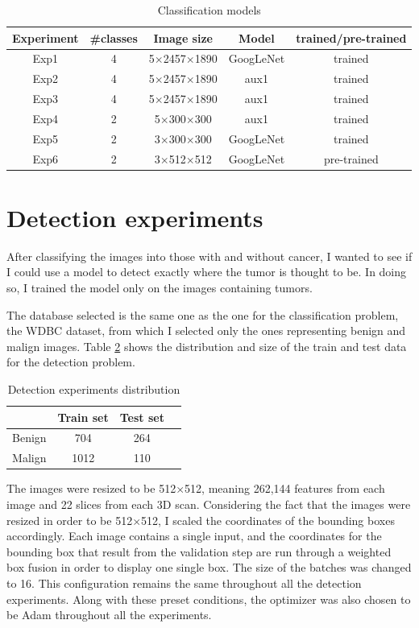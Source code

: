 \begin{table}[!ht]
    \centering
    \begin{tabular}{|c|c|c|c|c|}
    \hline
    Experiment & \#classes & Image size & Model & trained/pre-trained\\
    \hline\hline
    Exp1 & 4 & 5$\times$2457$\times$1890 & GoogLeNet & trained \\
    \hline
    Exp2 & 4 & 5$\times$2457$\times$1890 & aux1 & trained \\
    \hline
    Exp3 & 4 & 5$\times$2457$\times$1890 & aux1 & trained \\
    \hline
    Exp4 & 2 & 5$\times$300$\times$300 & aux1 & trained \\
    \hline
    Exp5 & 2 & 3$\times$300$\times$300 & GoogLeNet & trained \\
    \hline
    Exp6 & 2 & 3$\times$512$\times$512 & GoogLeNet & pre-trained \\
    \hline
    \end{tabular}
    \caption{Classification models}
    \label{tab:tab4}
\end{table}


\section{Detection experiments}

After classifying the images into those with and without cancer, I wanted to see if I could use a model to detect exactly where the tumor is thought to be. In doing so, I trained the model only on the images containing tumors.

The database selected is the same one as the one for the classification problem, the WDBC dataset, from which I selected only the ones representing benign and malign images. Table \ref{tab:tab7} shows the distribution and size of the train and test data for the detection problem.

\begin{table}[ht!]
\centering
\begin{tabular}{|c|c|c|c|}
    \hline
    & Train set & Test set \\ \hline
    Benign & 704 & 264 \\ \hline
    Malign & 1012 & 110\\ \hline
    \end{tabular}
    \caption{Detection experiments distribution}
    \label{tab:tab7}
\end{table}

The images were resized to be 512$\times$512, meaning 262,144 features from each image and 22 slices from each 3D scan. Considering the fact that the images were resized in order to be 512$\times$512, I scaled the coordinates of the bounding boxes
 accordingly. Each image contains a single input, and the coordinates for the bounding box that result from the validation step are run through a weighted box fusion in order to display one single box. The size of the batches was changed to 16. This configuration remains the same throughout all the detection experiments. Along with these preset conditions, the optimizer was also chosen to be Adam throughout all the experiments.


